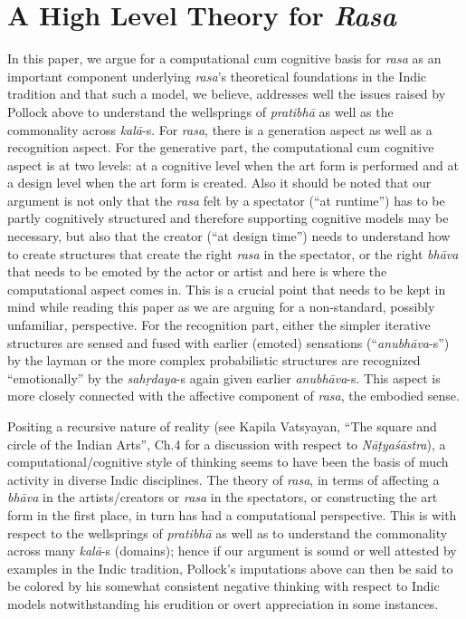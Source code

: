 \section{A High Level Theory for \textsl{Rasa}}\label{chap7-sec3}

In this paper, we argue for a computational cum cognitive basis for \textsl{rasa} as an important component underlying \textsl{rasa}’s theoretical foundations in the Indic tradition and that such a model, we believe, addresses well the issues raised by Pollock above to understand the wellsprings of \textsl{pratibhā} as well as the commonality across \textsl{kalā}-s. For \textsl{rasa}, there is a generation aspect as well as a recognition aspect. For the generative part, the computational cum cognitive aspect is at two levels: at a cognitive level when the art form is performed and at a design level when the art form is created. Also it should be noted that our argument is not only that the \textsl{rasa} felt by a spectator (“at runtime”) has to be partly cognitively structured and therefore supporting cognitive models may be necessary, but also that the creator (“at design time”) needs to understand how to create structures that create the right \textsl{rasa} in the spectator, or the right \textsl{bhāva} that needs to be emoted by the actor or artist and here is where the computational aspect comes in. This is a crucial point that needs to be kept in mind while reading this paper as we are arguing for a non-standard, possibly unfamiliar, perspective. For the recognition part, either the simpler iterative structures are sensed and fused with earlier (emoted) sensations (“\textsl{anubhāva}-s”) by the layman or the more complex probabilistic structures are recognized “emotionally” by the \textsl{sahṛdaya}-s again given earlier \textsl{anubhāva}-s. This aspect is more closely connected with the affective component of \textsl{rasa}, the embodied sense.

Positing a recursive nature of reality (see Kapila Vatsyayan, “The square and circle of the Indian Arts”, Ch.4 for a discussion with respect to \textsl{Nāṭyaśāstra}), a computational/cognitive style of thinking seems to have been the basis of much activity in diverse Indic disciplines. The theory of \textsl{rasa}, in terms of affecting a \textsl{bhāva} in the artists/creators or \textsl{rasa} in the spectators, or constructing the art form in the first place, in turn has had a computational perspective. This is with respect to the wellsprings of \textsl{pratibhā} as well as to understand the commonality across many \textsl{kalā}-s (domains); hence if our argument is sound or well attested by examples in the Indic tradition, Pollock’s imputations above can then be said to be colored by his somewhat consistent negative thinking with respect to Indic models notwithstanding his erudition or overt appreciation in some instances. 


